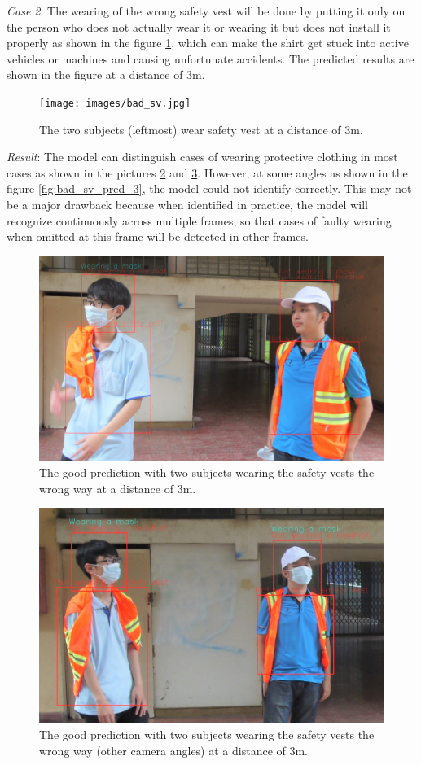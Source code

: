 \documentclass[conference]{IEEEtran}
\begin{document}
\emph{Case 2}: The wearing of the wrong safety vest will be done by putting it only on the person who does not actually wear it or wearing it but does not install it properly as shown in the figure \ref{fig:bad_sv}, which can make the shirt get stuck into active vehicles or machines and causing unfortunate accidents. The predicted results are shown in the figure at a distance of $ 3 $m.
\begin{figure}[ht]
	\centerline{\texttt{[image: images/bad\_sv.jpg]}}
  	\caption{The two subjects (leftmost) wear safety vest at a distance of 3m.}
  	\label{fig:bad_sv}
\end{figure}
\emph{Result}: The model can distinguish cases of wearing protective clothing in most cases as shown in the pictures \ref{fig:bad_sv_pred_1} and \ref{fig:bad_sv_pred_2}. However, at some angles as shown in the figure \ref{fig:bad_sv_pred_3}, the model could not identify correctly. This may not be a major drawback because when identified in practice, the model will recognize continuously across multiple frames, so that cases of faulty wearing when omitted at this frame will be detected in other frames.
\begin{figure}[ht]
	\centerline{\includegraphics[scale=0.1]{images/bad_sv_predict_2.jpg}}
  	\caption{The good prediction with two subjects wearing the safety vests the wrong way at a distance of 3m.}
  	\label{fig:bad_sv_pred_1}
\end{figure}
\begin{figure}[ht]
	\centerline{\includegraphics[scale=0.21]{images/bad_sv_predict_3.jpg}}
  	\caption{The good prediction with two subjects wearing the safety vests the wrong way (other camera angles) at a distance of 3m.}
  	\label{fig:bad_sv_pred_2}
\end{figure}
\end{document}
